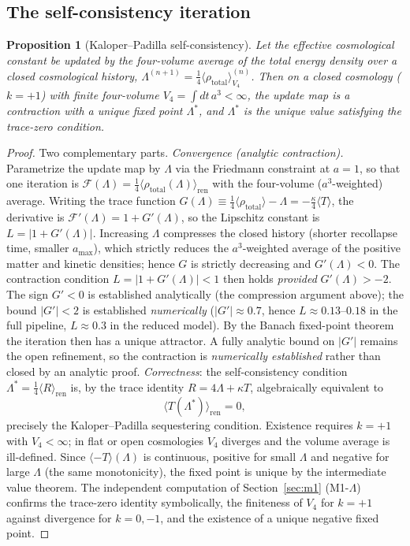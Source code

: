 \documentclass[11pt,a4paper]{article}
\theoremstyle{plain}
\newtheorem{proposition}[theorem]{Proposition}
\theoremstyle{definition}
\theoremstyle{remark}
\newcommand{\avg}[1]{\langle #1 \rangle}
\begin{document}
\subsection{The self-consistency iteration}
\begin{proposition}[Kaloper--Padilla self-consistency]
\label{thm:kp}
Let the effective cosmological constant be updated by the four-volume average of the total
energy density over a closed cosmological history,
$\Lambda^{(n+1)} = \tfrac14\avg{\rho_{\mathrm{total}}}^{(n)}_{V_4}$. Then on a closed cosmology
($k=+1$) with finite four-volume $V_4 = \int dt\, a^3 < \infty$, the update map is a contraction
with a unique fixed point $\Lambda^*$, and $\Lambda^*$ is the unique value satisfying the
trace-zero condition.
\end{proposition}
\begin{proof}
Two complementary parts. \emph{Convergence (analytic contraction).} Parametrize the update map
by $\Lambda$ via the Friedmann constraint at $a=1$, so that one iteration is $\mathcal{F}(\Lambda)
= \tfrac14\avg{\rho_{\mathrm{total}}(\Lambda)}_{\mathrm{ren}}$ with the four-volume ($a^3$-weighted)
average. Writing the trace function $G(\Lambda) \equiv \tfrac14\avg{\rho_{\mathrm{total}}}
- \Lambda = -\tfrac{\kappa}{4}\avg{T}$, the derivative is $\mathcal{F}'(\Lambda) = 1 + G'(\Lambda)$,
so the Lipschitz constant is $L = |1 + G'(\Lambda)|$. Increasing $\Lambda$ compresses the
closed history (shorter recollapse time, smaller $a_{\max}$), which strictly reduces the
$a^3$-weighted average of the positive matter and kinetic densities; hence $G$ is strictly
decreasing and $G'(\Lambda) < 0$. The contraction condition $L = |1 + G'(\Lambda)| < 1$ then holds
\emph{provided} $G'(\Lambda) > -2$. The sign $G'<0$ is established analytically (the compression
argument above); the bound $|G'| < 2$ is established \emph{numerically} ($|G'|\approx 0.7$, hence
$L\approx 0.13$--$0.18$ in the full pipeline, $L\approx 0.3$ in the reduced model). By the Banach
fixed-point theorem the iteration then has a unique attractor. A fully analytic bound on $|G'|$
remains the open refinement, so the contraction is \emph{numerically established} rather than
closed by an analytic proof. \emph{Correctness}: the
self-consistency condition $\Lambda^* = \tfrac14\avg{R}_{\mathrm{ren}}$ is, by the trace identity
$R = 4\Lambda + \kappa T$, algebraically equivalent to
\begin{equation}
\label{eq:tracezero}
\avg{T(\Lambda^*)}_{\mathrm{ren}} = 0 ,
\end{equation}
precisely the Kaloper--Padilla sequestering condition. Existence requires $k=+1$ with
$V_4 < \infty$; in flat or open cosmologies $V_4$ diverges and the volume average is
ill-defined. Since $\avg{-T}(\Lambda)$ is continuous, positive for small $\Lambda$ and negative
for large $\Lambda$ (the same monotonicity), the fixed point is unique by the intermediate value
theorem. The independent computation of Section~\ref{sec:m1} (M1-$\Lambda$) confirms the
trace-zero identity symbolically, the finiteness of $V_4$ for $k=+1$ against divergence for
$k=0,-1$, and the existence of a unique negative fixed point.
\end{proof}
\end{document}
